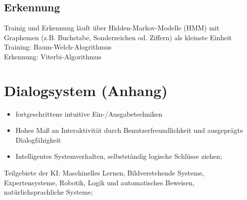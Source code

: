 \documentclass[german,color,6pt]{latex4ei/latex4ei_sheet}
\begin{document}
\begin{sectionbox}
	\subsection{Erkennung}
		Trainig und Erkennung läuft über Hidden-Markov-Modelle (HMM) mit Graphemen (z.B. Buchstabe, Sonderzeichen od. Ziffern) als kleinste Einheit\\
		Training: Baum-Welch-Alogrithmus\\
		Erkennung: Viterbi-Algorithmus\\
\end{sectionbox}



\section{Dialogsystem (Anhang)}
\begin{symbolbox}
\begin{itemize}
	\item fortgeschrittene intuitive Ein-/Ausgabetechniken
	\item Hohes Maß an Interaktivität durch Benutzerfreundlichkeit und ausgeprägte Dialogfähigkeit
	\item Intelligentes Systemverhalten, selbstständig logische Schlüsse ziehen;
\end{itemize}
\end{symbolbox}
Teilgebiete der KI: Maschinelles Lernen, Bildverstehende Systeme, Expertensysteme, Robotik, Logik und automatisches Beweisen, natürlichsprachliche Systeme;



\end{document}
